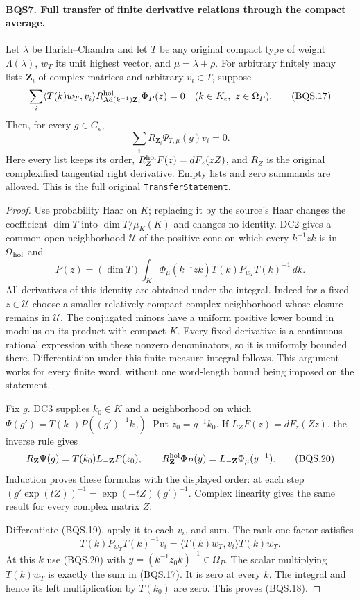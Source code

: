\paragraph{BQS7. Full transfer of finite derivative relations through the compact average.}
\label{claim:BQS7}
Let $\lambda$ be Harish--Chandra and let $T$ be any original
compact type of weight $\Lambda(\lambda)$,
$w_T$ its unit highest vector, and $\mu=\lambda+\rho$.
For arbitrary finitely many lists $\mathbf Z_i$ of complex matrices
and arbitrary $v_i\in T$, suppose
\[
 \sum_i\langle T(k)w_T,v_i\rangle
       R^{\rm hol}_{\operatorname{Ad}(k^{-1})\mathbf Z_i}
                         \Phi_P(z)=0
 \quad(k\in K_\epsilon,\ z\in\Omega_P).
 \tag{BQS.17}
\]
Then, for every $g\in G_\epsilon$,
\[
                  \sum_i R_{\mathbf Z_i}\Psi_{T,\mu}(g)v_i=0.
 \tag{BQS.18}
\]
Here every list keeps its order, $R^{\rm hol}_ZF(z)=dF_z(zZ)$, and
$R_Z$ is the original complexified tangential right derivative.
Empty lists and zero summands are allowed.  This is the full original
\texttt{TransferStatement}.

\begin{proof}
Use probability Haar on $K$; replacing it by the source's Haar changes
the coefficient $\dim T$ into $\dim T/\mu_K(K)$ and changes no identity.
DC2 gives a common open neighborhood $\mathcal U$ of the positive cone
on which every $k^{-1}zk$ is in $\Omega_{\rm hol}$ and
\[
 P(z)=(\dim T)\int_K\Phi_\mu(k^{-1}zk)
                 T(k)P_{w_T}T(k)^{-1}\,dk.
 \tag{BQS.19}
\]
All derivatives of this identity are obtained under the integral.
Indeed for a fixed $z\in\mathcal U$ choose a smaller relatively compact
complex neighborhood whose closure remains in $\mathcal U$.
The conjugated minors have a uniform positive lower bound in modulus
on its product with compact $K$.  Every fixed derivative is a continuous
rational expression with these nonzero denominators, so it is uniformly
bounded there.  Differentiation under this finite measure integral follows.
This argument works for every finite word, without one word-length bound
being imposed on the statement.

Fix $g$.  DC3 supplies $k_0\in K$ and a neighborhood on which
$\Psi(g')=T(k_0)P((g')^{-1}k_0)$.  Put $z_0=g^{-1}k_0$.
If $L_ZF(z)=dF_z(Zz)$, the inverse rule gives
\[
 R_{\mathbf Z}\Psi(g)
       =T(k_0)L_{-\mathbf Z}P(z_0),
 \qquad
 R^{\rm hol}_{\mathbf Z}\Phi_P(y)
       =L_{-\mathbf Z}\Phi_\mu(y^{-1}).
 \tag{BQS.20}
\]
Induction proves these formulas with the displayed order: at each
step $(g'\exp(tZ))^{-1}=\exp(-tZ)(g')^{-1}$.
Complex linearity gives the same result for every complex matrix $Z$.

Differentiate (BQS.19), apply it to each $v_i$, and sum.
The rank-one factor satisfies
\[
 T(k)P_{w_T}T(k)^{-1}v_i
             =\langle T(k)w_T,v_i\rangle T(k)w_T.
 \tag{BQS.21}
\]
At this $k$ use (BQS.20) with
$y=(k^{-1}z_0k)^{-1}\in\Omega_P$.
The scalar multiplying $T(k)w_T$ is exactly the sum in (BQS.17).
It is zero at every $k$.  The integral and hence its left multiplication
by $T(k_0)$ are zero.  This proves (BQS.18).
\end{proof}

